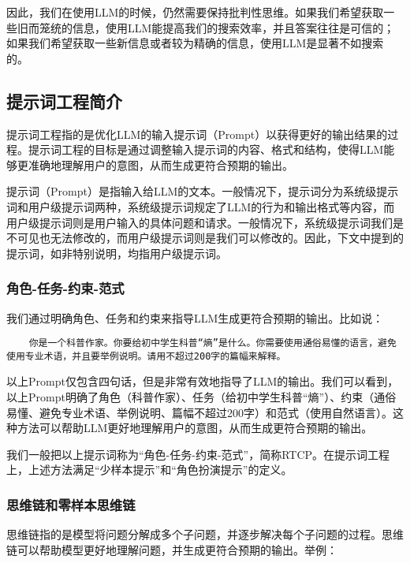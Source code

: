 \documentclass[../main.tex]{subfiles}
\begin{document}
因此，我们在使用LLM的时候，仍然需要保持批判性思维。如果我们希望获取一些旧而笼统的信息，使用LLM能提高我们的搜索效率，并且答案往往是可信的；如果我们希望获取一些新信息或者较为精确的信息，使用LLM是显著不如搜索的。

\subsection{提示词工程简介}

提示词工程指的是优化LLM的输入提示词（Prompt）以获得更好的输出结果的过程。提示词工程的目标是通过调整输入提示词的内容、格式和结构，使得LLM能够更准确地理解用户的意图，从而生成更符合预期的输出。

提示词（Prompt）是指输入给LLM的文本。一般情况下，提示词分为系统级提示词和用户级提示词两种，系统级提示词规定了LLM的行为和输出格式等内容，而用户级提示词则是用户输入的具体问题和请求。一般情况下，系统级提示词我们是不可见也无法修改的，而用户级提示词则是我们可以修改的。因此，下文中提到的提示词，如非特别说明，均指用户级提示词。

\subsubsection{角色-任务-约束-范式}

我们通过明确角色、任务和约束来指导LLM生成更符合预期的输出。比如说：

\begin{lstlisting}
    你是一个科普作家。你要给初中学生科普“熵”是什么。你需要使用通俗易懂的语言，避免使用专业术语，并且要举例说明。请用不超过200字的篇幅来解释。
\end{lstlisting}

以上Prompt仅包含四句话，但是非常有效地指导了LLM的输出。我们可以看到，以上Prompt明确了角色（科普作家）、任务（给初中学生科普“熵”）、约束（通俗易懂、避免专业术语、举例说明、篇幅不超过200字）和范式（使用自然语言）。这种方法可以帮助LLM更好地理解用户的意图，从而生成更符合预期的输出。

我们一般把以上提示词称为“角色-任务-约束-范式”，简称RTCP。在提示词工程上，上述方法满足“少样本提示”和“角色扮演提示”的定义。

\subsubsection{思维链和零样本思维链}

思维链指的是模型将问题分解成多个子问题，并逐步解决每个子问题的过程。思维链可以帮助模型更好地理解问题，并生成更符合预期的输出。举例：
\end{document}
